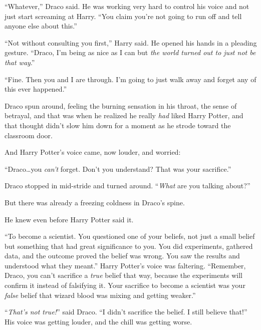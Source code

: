 “Whatever,” Draco said. He was working very hard to control his voice and not just start screaming at Harry. “You claim you’re not going to run off and tell anyone else about this.”

“Not without consulting you first,” Harry said. He opened his hands in a pleading gesture. “Draco, I’m being as nice as I can but \emph{the world turned out to just not be that way}.”

“Fine. Then you and I are through. I’m going to just walk away and forget any of this ever happened.”

Draco spun around, feeling the burning sensation in his throat, the sense of betrayal, and that was when he realized he really \emph{had} liked Harry Potter, and that thought didn’t slow him down for a moment as he strode toward the classroom door.

And Harry Potter’s voice came, now louder, and worried:

“Draco…you \emph{can’t} forget. Don’t you understand? That was your sacrifice.”

Draco stopped in mid-stride and turned around. “\emph{What} are you talking about?”

But there was already a freezing coldness in Draco’s spine.

He knew even before Harry Potter said it.

“To become a scientist. You questioned one of your beliefs, not just a small belief but something that had great significance to you. You did experiments, gathered data, and the outcome proved the belief was wrong. You saw the results and understood what they meant.” Harry Potter’s voice was faltering. “Remember, Draco, you can’t sacrifice a \emph{true} belief that way, because the experiments will confirm it instead of falsifying it. Your sacrifice to become a scientist was your \emph{false} belief that wizard blood was mixing and getting weaker.”

“\emph{That’s not true!}” said Draco. “I didn’t sacrifice the belief. I still believe that!” His voice was getting louder, and the chill was getting worse.

